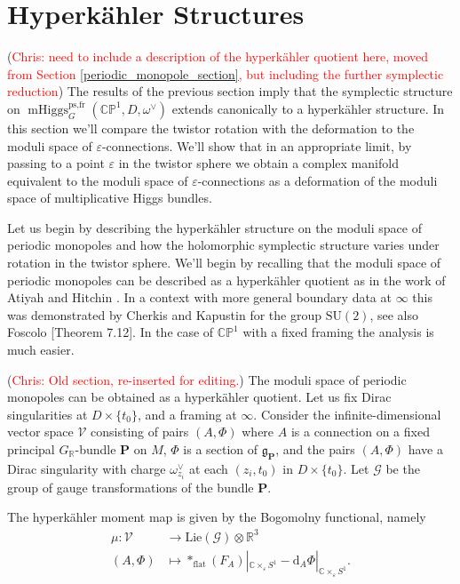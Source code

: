 \documentclass[11pt, oneside, reqno]{amsart}
\theoremstyle{definition} \newtheorem{definition}{Definition}[section]
\theoremstyle{definition} \newtheorem{remark}[definition]{Remark}
\theoremstyle{definition} \newtheorem{remarks}[definition]{Remarks}
\theoremstyle{definition} \newtheorem{question}[definition]{Question}
\theoremstyle{definition} \newtheorem*{note}{Note}
\theoremstyle{definition} \newtheorem{example}[definition]{Example}
\theoremstyle{definition} \newtheorem{examples}[definition]{Examples}
\renewcommand{\gg}{\mathfrak{g}}
\newcommand{\bb}[1]{\mathbb{#1}}
\newcommand{\mr}[1]{\mathrm{#1}}
\newcommand{\mc}[1]{\mathcal{#1}}
\newcommand{\bo}[1]{\boldsymbol{#1}}
\newcommand{\CC}{\mathbb{C}}
\newcommand{\RR}{\mathbb{R}}
\newcommand{\eps}{\varepsilon}
\newcommand{\SU}{\mathrm{SU}}
\DeclareMathOperator{\mhiggs}{mHiggs}
\renewcommand{\d}{\mathrm{d}}
\newcommand{\chris}[1]{(\textcolor{red}{Chris: #1})}
\begin{document}
\section{Hyperk\"ahler Structures} \label{hyperkahler_section}
\chris{need to include a description of the hyperk\"ahler quotient here, moved from Section \ref{periodic_monopole_section}, but including the further symplectic reduction}
The results of the previous section imply that the symplectic structure on $\mhiggs_G^{\text{ps,fr}}(\bb{CP}^1,D,\omega^\vee)$ extends canonically to a hyperk\"ahler structure.  In this section we'll compare the twistor rotation with the deformation to the moduli space of $\eps$-connections. We'll show that in an appropriate limit, by passing to a point $\eps$ in the twistor sphere we obtain a complex manifold equivalent to the moduli space of $\eps$-connections as a deformation of the moduli space of multiplicative Higgs bundles.

Let us begin by describing the hyperk\"ahler structure on the moduli space of periodic monopoles and how the holomorphic symplectic structure varies under rotation in the twistor sphere.  We'll begin by recalling that the moduli space of periodic monopoles can be described as a hyperk\"ahler quotient as in the work of Atiyah and Hitchin \cite{AtiyahHitchin}.  In a context with more general boundary data at $\infty$ this was demonstrated by Cherkis and Kapustin \cite{CherkisKapustin3} for the group $\SU(2)$, see also Foscolo \cite{FoscoloDef}[Theorem 7.12].  In the case of $\bb{CP}^1$ with a fixed framing the analysis is much easier.

\chris{Old section, re-inserted for editing.}  The moduli space of periodic monopoles can be obtained as a hyperk\"ahler quotient.  Let us fix Dirac singularities at $D \times \{t_0\}$, and a framing at $\infty$.  Consider the infinite-dimensional vector space $\mc V$ consisting of pairs $(A,\Phi)$ where $A$ is a connection on a fixed principal $G_\RR$-bundle $\bo P$ on $M$, $\Phi$ is a section of $\gg_{\bo P}$, and the pairs $(A,\Phi)$ have a Dirac singularity with charge $\omega^\vee_{z_i}$ at each $(z_i,t_0)$ in $D \times \{t_0\}$.  Let $\mc G$ be the group of gauge transformations of the bundle $\bo P$.

The hyperk\"ahler moment map is given by the Bogomolny functional, namely
\begin{align*}
\mu \colon \mc V &\to \mr{Lie}(\mc G) \otimes \RR^3 \\
(A,\Phi) &\mapsto \ast_{\mr{flat}} (F_A)|_{\CC \times_\eps S^1}- \d_A \Phi|_{\CC \times_\eps S^1}.
\end{align*}
\end{document}
